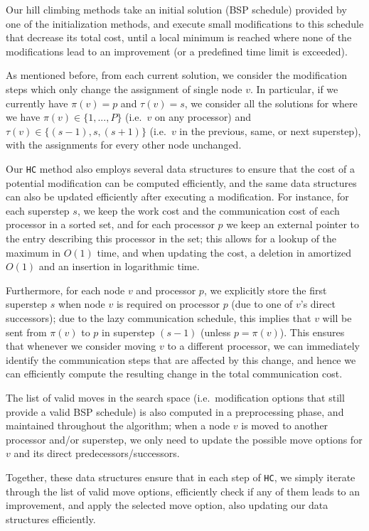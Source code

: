 \documentclass[sigconf,nonacm]{acmart}
\begin{document}
Our hill climbing methods take an initial solution (BSP schedule) provided by one of the initialization methods, and execute small modifications to this schedule that decrease its total cost, until a local minimum is reached where none of the modifications lead to an improvement (or a predefined time limit is exceeded).

As mentioned before, from each current solution, we consider the modification steps which only change the assignment of single node $v$. In particular, if we currently have $\pi(v)=p$ and $\tau(v)=s$, we consider all the solutions for where we have $\pi(v) \in \{ 1, ..., P \}$ (i.e.\ $v$ on any processor) and $\tau(v) \in \{ (s-1), s, (s+1) \}$ (i.e.\ $v$ in the previous, same, or next superstep), with the assignments for every other node unchanged.

Our \texttt{HC} method also employs several data structures to ensure that the cost of a potential modification can be computed efficiently, and the same data structures can also be updated efficiently after executing a modification. For instance, for each superstep $s$, we keep the work cost and the communication cost of each processor in a sorted set, and for each processor $p$ we keep an external pointer to the entry describing this processor in the set; this allows for a lookup of the maximum in $O(1)$ time, and when updating the cost, a deletion in amortized $O(1)$ and an insertion in logarithmic time.

Furthermore, for each node $v$ and processor $p$, we explicitly store the first superstep $s$ when node $v$ is required on processor $p$ (due to one of $v$'s direct successors); due to the lazy communication schedule, this implies that $v$ will be sent from $\pi(v)$ to $p$ in superstep $(s-1)$ (unless $p=\pi(v)$). This ensures that whenever we consider moving $v$ to a different processor, we can immediately identify the communication steps that are affected by this change, and hence we can efficiently compute the resulting change in the total communication cost.

The list of valid moves in the search space (i.e.\ modification options that still provide a valid BSP schedule) is also computed in a preprocessing phase, and maintained throughout the algorithm; when a node $v$ is moved to another processor and/or superstep, we only need to update the possible move options for $v$ and its direct predecessors/successors.

Together, these data structures ensure that in each step of \texttt{HC}, we simply iterate through the list of valid move options, efficiently check if any of them leads to an improvement, and apply the selected move option, also updating our data structures efficiently.
\end{document}
